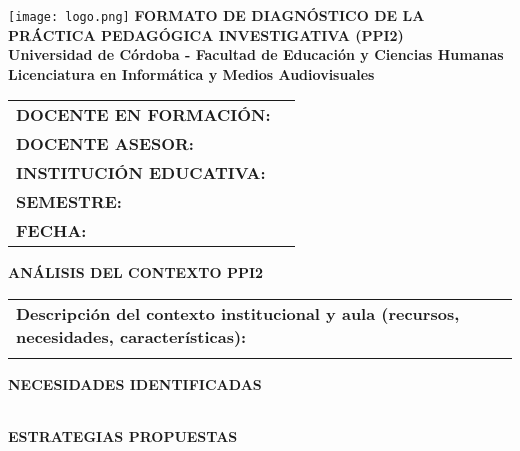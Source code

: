 \documentclass[a4paper,12pt]{article}
\begin{document}
\begin{center}
    \vspace*{1cm}
    \texttt{[image: logo.png]} %
    \vspace{0.5cm}
    \textbf{\Large FORMATO DE DIAGNÓSTICO DE LA PRÁCTICA PEDAGÓGICA INVESTIGATIVA (PPI2)} \\
    \vspace{0.5cm}
    \textbf{Universidad de Córdoba - Facultad de Educación y Ciencias Humanas} \\
    \textbf{Licenciatura en Informática y Medios Audiovisuales}
\end{center}

\vspace{0.5cm}
\begin{tabularx}{\textwidth}{@{}p{5cm}X@{}}
    \toprule
    \textbf{DOCENTE EN FORMACIÓN:} & \hrulefill \\
    \textbf{DOCENTE ASESOR:} & \hrulefill \\
    \textbf{INSTITUCIÓN EDUCATIVA:} & \hrulefill \\
    \textbf{SEMESTRE:} & \hrulefill \\
    \textbf{FECHA:} & \hrulefill \\
    \bottomrule
\end{tabularx}

\vspace{0.5cm}
\noindent
\textbf{ANÁLISIS DEL CONTEXTO PPI2}
\begin{tabularx}{\textwidth}{|X|}
    \hline
    \textbf{Descripción del contexto institucional y aula (recursos, necesidades, características):} \\
    \vspace{3cm} \\ \hline
\end{tabularx}

\vspace{0.5cm}
\noindent
\textbf{NECESIDADES IDENTIFICADAS}
\begin{tabularx}{\textwidth}{|X|}
    \hline
    \vspace{3cm} \\ \hline
\end{tabularx}

\vspace{0.5cm}
\noindent
\textbf{ESTRATEGIAS PROPUESTAS}
\begin{tabularx}{\textwidth}{|X|}
    \hline
    \vspace{3cm} \\ \hline
\end{tabularx}
\end{document}
